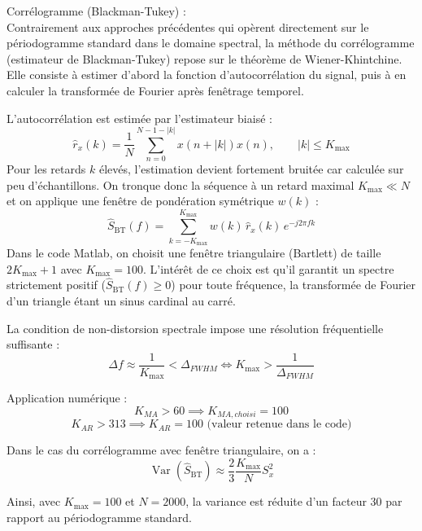 \documentclass[11pt,a4paper]{article}
\begin{document}
\bigskip
Corrélogramme (Blackman-Tukey) :\\
\indent Contrairement aux approches précédentes qui opèrent directement sur le périodogramme standard dans le domaine spectral, la méthode du corrélogramme (estimateur de Blackman-Tukey) repose sur le théorème de Wiener-Khintchine. Elle consiste à estimer d'abord la fonction d'autocorrélation du signal, puis à en calculer la transformée de Fourier après fenêtrage temporel.

L'autocorrélation est estimée par l'estimateur biaisé :
\begin{equation}
    \hat{r}_x(k) = \frac{1}{N} \sum_{n=0}^{N-1-|k|} x(n+|k|) x(n), \qquad |k| \leq K_{\max}
\end{equation}
Pour les retards $k$ élevés, l'estimation devient fortement bruitée car calculée sur peu d'échantillons. On tronque donc la séquence à un retard maximal $K_{\max} \ll N$ et on applique une fenêtre de pondération symétrique $w(k)$ :
\begin{equation}
    \hat{S}_{\text{BT}}(f) = \sum_{k=-K_{\max}}^{K_{\max}} w(k)\, \hat{r}_x(k)\, e^{-j 2 \pi f k}
\end{equation}
Dans le code Matlab, on choisit une fenêtre triangulaire (Bartlett) de taille $2 K_{\max} + 1$ avec $K_{\max} = 100$. L'intérêt de ce choix est qu'il garantit un spectre strictement positif ($\hat{S}_{\text{BT}}(f) \geq 0$) pour toute fréquence, la transformée de Fourier d'un triangle étant un sinus cardinal au carré.

La condition de non-distorsion spectrale impose une résolution fréquentielle suffisante :
\begin{equation}
    \Delta f \approx \frac{1}{K_{\max}} < \Delta_{FWHM} \iff K_{\max} > \frac{1}{\Delta_{FWHM}}
\end{equation}

Application numérique :
$$K_{MA} > 60 \implies K_{MA, choisi} = 100$$
$$K_{AR} > 313 \implies K_{AR} = 100 \text{ (valeur retenue dans le code)}$$

Dans le cas du corrélogramme avec fenêtre triangulaire, on a :
\begin{equation}
    \operatorname{Var}(\hat{S}_{\text{BT}}) \approx \frac{2}{3} \frac{K_{\max}}{N} S_x^2
\end{equation}

Ainsi, avec $K_{\max} = 100$ et $N = 2000$, la variance est réduite d'un facteur 30 par rapport au périodogramme standard.
\end{document}
